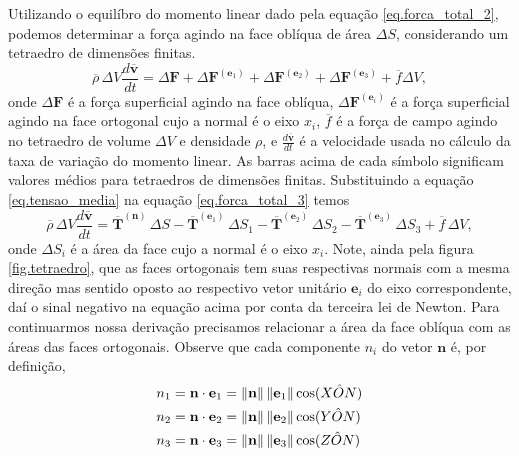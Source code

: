  Utilizando o equil\'ibro do momento linear dado pela equa\c{c}\~ao \ref{eq.forca_total_2}, podemos determinar a for\c{c}a agindo na face obl\'iqua de \'area $\Delta S$, considerando um tetraedro de dimens\~oes finitas.
\begin{equation}\label{eq.forca_total_3}
\overline{\rho}\,\Delta V\frac{d\overline{\mathbf{v}}}{dt}=\Delta \mathbf{F}+\Delta\mathbf{F}^{(\mathbf{e}_1)}+\Delta\mathbf{F}^{(\mathbf{e}_2)}+\Delta\mathbf{F}^{(\mathbf{e}_3)}+\overline{f}\Delta V,
\end{equation} 
onde $\Delta\mathbf{F}$ \'e a for\c{c}a superficial agindo na face obl\'iqua, $\Delta\mathbf{F}^{(\mathbf{e}_i)}$ \'e a for\c{c}a superficial agindo na face ortogonal cujo a normal \'e o eixo $x_i$, $\overline{f}$ \'e a for\c{c}a de campo agindo no tetraedro de volume $\Delta V$ e densidade $\rho$, e $\frac{d\overline{\mathbf{v}}}{dt}$ \'e a velocidade usada no c\'alculo da taxa de varia\c{c}\~ao do momento linear. As barras acima de cada s\'imbolo significam valores m\'edios para tetraedros de dimens\~oes finitas. Substituindo a equa\c{c}\~ao \ref{eq.tensao_media} na equa\c{c}\~ao \ref{eq.forca_total_3} temos
\begin{equation}\label{eq.forca_total_4}
\overline{\rho}\,\Delta V\frac{d\overline{\mathbf{v}}}{dt}=\mathbf{\overline{T}}^{(\mathbf{n})}\,\Delta S-\mathbf{\overline{T}}^{(\mathbf{e}_1)}\,\Delta S_1-\mathbf{\overline{T}}^{(\mathbf{e}_2)}\,\Delta S_2-\mathbf{\overline{T}}^{(\mathbf{e}_3)}\,\Delta S_3+\overline{f}\,\Delta V,
\end{equation}
onde $\Delta S_i$ \'e a \'area da face cujo a normal \'e o eixo $x_i$. Note, ainda pela figura \ref{fig.tetraedro}, que as faces ortogonais tem suas respectivas normais com a mesma dire\c{c}\~ao mas sentido oposto ao respectivo vetor unit\'ario $\mathbf{e}_i$ do eixo correspondente, da\'i o sinal negativo na equa\c{c}\~ao acima por conta da terceira lei de Newton. Para continuarmos nossa deriva\c{c}\~ao precisamos relacionar a \'area da face obl\'iqua com as \'areas das faces ortogonais. Observe que cada componente $n_i$ do vetor $\mathbf{n}$ \'e, por defini\c{c}\~ao,
\begin{align*}
n_1&=\mathbf{n}\cdot\mathbf{e}_1=\lVert\mathbf{n}\rVert\,\lVert\mathbf{e}_1\rVert\cos(X\hat{O}N)\\
n_2&=\mathbf{n}\cdot\mathbf{e}_2=\lVert\mathbf{n}\rVert\,\lVert\mathbf{e}_2\rVert\cos(Y\hat{O}N)\\
n_3&=\mathbf{n}\cdot\mathbf{e}_3=\lVert\mathbf{n}\rVert\,\lVert\mathbf{e}_3\rVert\cos(Z\hat{O}N)\\
\end{align*}

